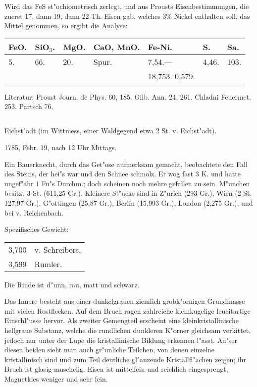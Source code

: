 \documentclass[a4paper, 11pt, oneside]{article}
\begin{document}
Wird das FeS st"ochiometrisch zerlegt, und aus Prousts Eisenbestimmungen, die zuerst 17, dann 19, dann 22 Th. Eisen gab, welches 3\% Nickel enthalten soll, das Mittel genommen, so ergibt die Analyse:
\begin{table}[!ht]
    \centering\swabfamily\Large
    \begin{tabular}{l l l l l l l}
        FeO. & SiO$_{3}$. & MgO. & CaO, MnO. & Fe-Ni. & S. & Sa. \\ \hline
        5. & 66. & 20. & Spur. & 7,54.--- & 4,46. & 103. \\
         &  &  &  & 18,753. 0,579. &  &
    \end{tabular}
\end{table}

\normalsize
Literatur: Proust Journ. de Phys. 60, 185. Gilb. Ann. 24, 261. Chladni Feuermet. 253. Partsch 76.
\subsection{}
\LARGE
\paragraph{}
Eichst"adt (im Wittmess, einer Waldgegend etwa 2 St. v. Eichst"adt).

1785, Febr. 19, nach 12 Uhr Mittags.

Ein Bauerknecht, durch das Get"ose aufmerksam gemacht, beobachtete den Fall des Steins, der hei"s war und den Schnee schmolz. Er wog fast 3 K. und hatte ungef"ahr 1 Fu"s Durchm.; doch scheinen noch mehre gefallen zu sein. M"unchen besitzt 3 St. (611,25 Gr.). Kleinere St"ucke sind in Z"urich (293 Gr.), Wien (2 St. 127,97 Gr.), G"ottingen (25,87 Gr.), Berlin (15,993 Gr.), London (2,275 Gr.), und bei v. Reichenbach.

Spezifisches Gewicht:
\begin{table}[!ht]
    \centering\swabfamily\Large
    \begin{tabular}{l l}
        3,700 & v. Schreibers,\\
        3,599 & Rumler.
    \end{tabular}
\end{table}

Die Rinde ist d"unn, rau, matt und schwarz.

Das Innere besteht aus einer dunkelgrauen ziemlich grobk"ornigen Grundmasse mit vielen Rostflecken. Auf dem Bruch ragen zahlreiche kleinkugelige leucitartige Einschl"usse hervor. Als zweiter Gemengteil erscheint eine kleinkristallinische hellgraue Substanz, welche die rundlichen dunkleren K"orner gleichsam verkittet, jedoch nur unter der Lupe die kristallinische Bildung erkennen l"asst. Au"ser diesen beiden sieht man auch gr"unliche Teilchen, von denen einzelne kristallinisch sind und zum Teil deutliche gl"anzende Kristallfl"achen zeigen; ihr Bruch ist glasig-muschelig. Eisen ist mittelfein und reichlich eingesprengt, Magnetkies weniger und sehr fein.
\end{document}
